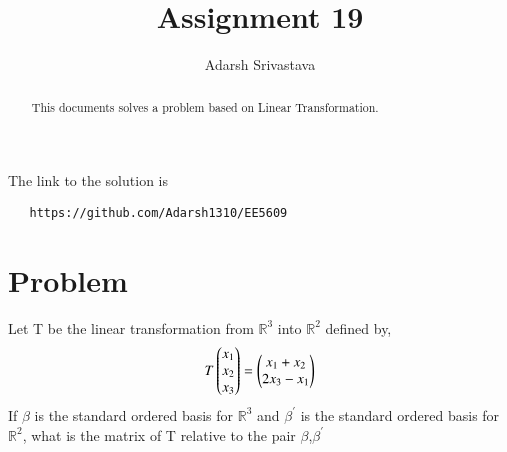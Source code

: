 \documentclass[journal,12pt,twocolumn]{IEEEtran}
\begin{document}
       \def\rightbox#1{\makebox[0in][r]{#1}}
       \def\centbox#1{\makebox[0in]{#1}}
       \def\topbox#1{\raisebox{-\baselineskip}[0in][0in]{#1}}
       \def\midbox#1{\raisebox{-0.5\baselineskip}[0in][0in]{#1}}
  \vspace{3cm}
  \title{Assignment 19}
  \author{Adarsh Srivastava}
  \maketitle
  \newpage
  \bigskip
  \renewcommand{\thetable}{\theenumi}
  The link to the solution is
  \begin{lstlisting}
   https://github.com/Adarsh1310/EE5609
  \end{lstlisting}
  \begin{abstract}
  This documents solves a problem based on Linear Transformation.
  \end{abstract}
   \section{\textbf{Problem}}
   Let T be the linear transformation from $\mathbb{R}^3$ into $\mathbb{R}^2$ defined by,
   \begin{align*}
   T\begin{pmatrix}x_1\\x_2\\x_3\end{pmatrix}=\begin{pmatrix}x_1+x_2\\2x_3-x_1\end{pmatrix}
   \end{align*}
   If $\beta$ is the standard ordered basis for $\mathbb{R}^3$ and $\beta^'$ is the standard ordered basis for $\mathbb{R}^2$, what is the matrix of T relative to the pair $\beta$,$\beta^'$
\end{document}
